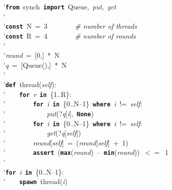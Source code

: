 \'\>\texttt{\textbf{from}}~synch~\texttt{\textbf{import}}~Queue,~\textit{put},~\textit{get}\\

\'\>\\

\'\>\texttt{\textbf{const}}~N~=~3~~~~~~~~\emph{\# number of threads}\\

\'\>\texttt{\textbf{const}}~R~=~4~~~~~~~~\emph{\# number of rounds}\\

\'\>\\

\'\>\textit{round}~=~[0,]~*~N\\

\'\>\textit{q}~=~[Queue(),]~*~N\\

\'\>\\

\'\>\texttt{\textbf{def}}~thread(\textit{self}):\\

\'\>~~~~\texttt{\textbf{for}}~\textit{r}~\texttt{\textbf{in}}~\{1..R\}:\\

\'\>~~~~~~~~\texttt{\textbf{for}}~\textit{i}~\texttt{\textbf{in}}~\{0..N--1\}~\texttt{\textbf{where}}~\textit{i}~!=~\textit{self}:\\

\'\>~~~~~~~~~~~~\textit{put}(?\textit{q}[\textit{i}],~\texttt{\textbf{None}})\\

\'\>~~~~~~~~\texttt{\textbf{for}}~\textit{i}~\texttt{\textbf{in}}~\{0..N--1\}~\texttt{\textbf{where}}~\textit{i}~!=~\textit{self}:\\

\'\>~~~~~~~~~~~~\textit{get}(?\textit{q}[\textit{self}])\\

\'\>~~~~~~~~\textit{round}[\textit{self}]~=~(\textit{round}[\textit{self}]~+~1)\\

\'\>~~~~~~~~\texttt{\textbf{assert}}~(\texttt{\textbf{max}}(\textit{round})~--~\texttt{\textbf{min}}(\textit{round}))~$<=$~1\\

\'\>\\

\'\>\texttt{\textbf{for}}~\textit{i}~\texttt{\textbf{in}}~\{0..N--1\}:\\

\'\>~~~~\texttt{\textbf{spawn}}~thread(\textit{i})